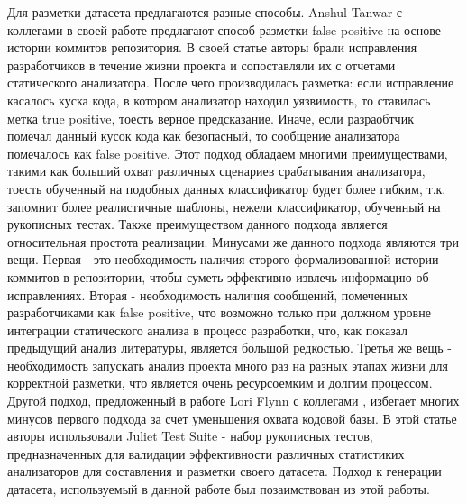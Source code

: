 Для разметки датасета предлагаются разные способы. Anshul Tanwar с коллегами в своей работе \cite{assesing-validity-of-sa-warnings-cisco} предлагают способ разметки false positive на основе истории коммитов репозитория. В своей статье авторы брали исправления разработчиков в течение жизни проекта и сопоставляли их с отчетами статического анализатора. После чего производилась разметка: если исправление касалось куска кода, в котором анализатор находил уязвимость, то ставилась метка true positive, тоесть верное предсказание. Иначе, если разраобтчик помечал данный кусок кода как безопасный, то сообщение анализатора помечалось как false positive. Этот подход обладаем многими преимуществами, такими как больший охват различных сценариев срабатывания анализатора, тоесть обученный на подобных данных классификатор будет более гибким, т.к. запомнит более реалистичные шаблоны, нежели классификатор, обученный на рукописных тестах. Также преимуществом данного подхода является относительная простота реализации. Минусами же данного подхода являются три вещи. Первая - это необходимость наличия сторого формализованной истории коммитов в репозитории, чтобы суметь эффективно извлечь информацию об исправлениях. Вторая - необходимость наличия сообщений, помеченных разработчиками как false positive, что возможно только при должном уровне интеграции статического анализа в процесс разработки, что, как показал предыдущий анализ литературы, является большой редкостью. Третья же вещь - необходимость запускать анализ проекта много раз на разных этапах жизни для корректной разметки, что является очень ресурсоемким и долгим процессом. Другой подход, предложенный в работе Lori Flynn с коллегами \cite{test-suites-for-dataset}, избегает многих минусов первого подхода за счет уменьшения охвата кодовой базы. В этой статье авторы использовали Juliet Test Suite - набор рукописных тестов, предназначенных для валидации эффективности различных статистиких анализаторов\cite{Juliet} для составления и разметки своего датасета. Подход к генерации датасета, используемый в данной работе был позаимствован из этой работы.

\newpage